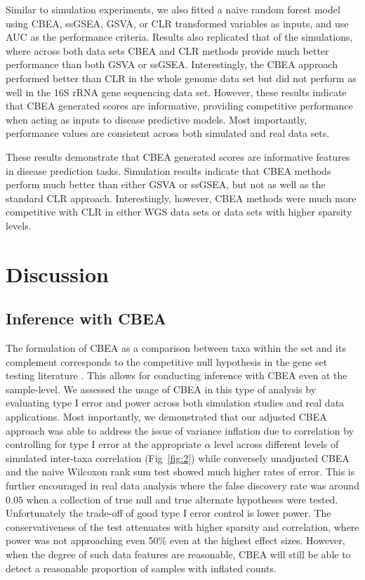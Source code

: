 \documentclass[10pt,letterpaper]{article}
\begin{document}
Similar to simulation experiments, we also fitted a naive random forest model using CBEA, ssGSEA, GSVA, or CLR transformed variables as inputs, and use AUC as the performance criteria. Results also replicated that of the simulations, where across both data sets CBEA and CLR methods provide much better performance than both GSVA or ssGSEA. Interestingly, the CBEA approach performed better than CLR in the whole genome data set but did not perform as well in the 16S rRNA gene sequencing data set. However, these results indicate that CBEA generated scores are informative, providing competitive performance when acting as inputs to disease predictive models. Most importantly, performance values are consistent across both simulated and real data sets. 

These results demonstrate that CBEA generated scores are informative features in disease prediction tasks. Simulation results indicate that CBEA methods perform much better than either GSVA or ssGSEA, but not as well as the standard CLR approach. Interestingly, however, CBEA methods were much more competitive with CLR in either WGS data sets or data sets with higher sparsity levels. 


\section*{Discussion}

\subsection*{Inference with CBEA}
The formulation of CBEA as a comparison between taxa within the set and its complement corresponds to the competitive null hypothesis in the gene set testing literature \cite{tian2005}. This allows for conducting inference with CBEA even at the sample-level. We assessed the usage of CBEA in this type of analysis by evaluating type I error and power across both simulation studies and real data applications. Most importantly, we demonstrated that our adjusted CBEA approach was able to address the issue of variance inflation due to correlation \cite{wu2012} by controlling for type I error at the appropriate $\alpha$ level across different levels of simulated inter-taxa correlation (Fig~\ref{fig:2}) while conversely unadjusted CBEA and the naive Wilcoxon rank sum test showed much higher rates of error. This is further encouraged in real data analysis where the false discovery rate was around $0.05$ when a collection of true null and true alternate hypotheses were tested. Unfortunately the trade-off of good type I error control is lower power. The conservativeness of the test attenuates with higher sparsity and correlation, where power was not approaching even 50\% even at the highest effect sizes. However, when the degree of such data features are reasonable, CBEA will still be able to detect a reasonable proportion of samples with inflated counts.  
\end{document}
